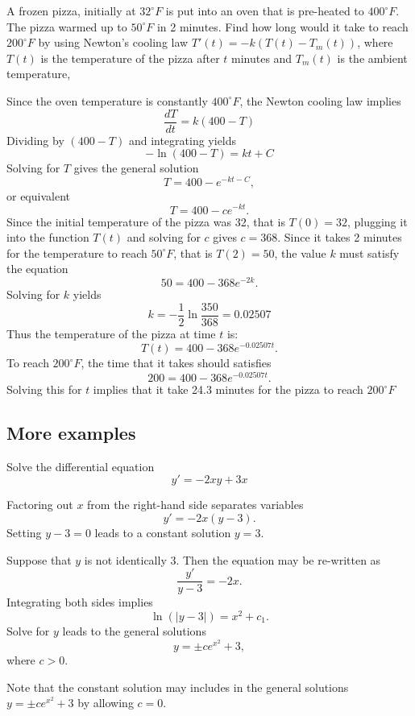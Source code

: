 \begin{exercise} 
  A frozen pizza, initially at $32^{\circ} F$ is put into an oven that is pre-heated to $400^{\circ} F$. The pizza warmed up to $50^{\circ} F$ in 2 minutes. Find how long would it take to reach $200^{\circ} F$ by using Newton's cooling law $T'(t) = -k(T(t) - T_m(t))$, where $T(t)$ is the temperature of the pizza after $t$ minutes and $T_m(t)$ is the ambient temperature,
\end{exercise}
\begin{exersol}
  Since the oven temperature is constantly $400^{\circ} F$, the Newton cooling law implies
  \[\frac{dT}{dt} = k (400-T)\]
  Dividing by $(400-T)$ and integrating yields
  \[
   -\ln(400-T) = kt + C
  \]
  Solving for $T$ gives the general solution
  \[T=400-e^{-kt-C},\]
  or equivalent
  \[T=400 - c e^{-kt}.\]
  Since the initial temperature of the pizza was 32, that is $T(0)=32$, plugging it into the function $T(t)$ and solving for $c$ gives $c=368$.
  Since it takes 2 minutes for the temperature to reach $50^\circ F$, that is $T(2)= 50$, the value $k$ must satisfy the equation
  \[50= 400 - 368 e^{-2k}.\]
  Solving for $k$ yields
  \[k= -\frac{1}{2} \ln{\frac{350}{368}} = 0.02507\]
  Thus the temperature of the pizza at time $t$ is:
  \[T(t) = 400- 368 e^{-0.02507t}.\]
  To reach $200^{\circ} F$, the time that it takes should satisfies
  \[200 = 400- 368 e^{-0.02507t}.\]
  Solving this for $t$ implies that it take 24.3 minutes for the pizza to reach $200^\circ F$
\end{exersol}


\subsection{More examples}

\begin{example}
  Solve the differential equation
  \[y'=-2xy+3x\]
\end{example}
\begin{solution}
Factoring out $x$ from the right-hand side separates variables
\[y'=-2x(y-3).\]
Setting $y-3=0$ leads to a constant solution $y=3$.

Suppose that $y$ is not identically 3. Then the equation may be re-written as
\[\frac{y'}{y-3}=-2x.\]
Integrating both sides implies
\[\ln(|y-3|)=x^2+c_1.\]
Solve for $y$ leads to the general solutions
\[y=\pm ce^{x^2}+3,\]
where $c>0$.

Note that the constant solution may includes in the general solutions $y=\pm ce^{x^2}+3$ by allowing $c=0$.
\end{solution}

